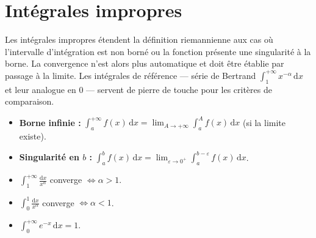 \documentclass[11pt,a4paper,twoside]{book}
\begin{document}
\begin{center}
\end{center}

\section{Intégrales impropres}

Les intégrales impropres étendent la définition riemannienne aux cas où l'intervalle d'intégration est non borné ou la fonction présente une singularité à la borne. La convergence n'est alors plus automatique et doit être établie par passage à la limite. Les intégrales de référence — série de Bertrand $\int_1^{+\infty} x^{-\alpha}\,\mathrm{d}x$ et leur analogue en $0$ — servent de pierre de touche pour les critères de comparaison.

\begin{definitionbox}
\begin{itemize}
  \item \textbf{Borne infinie :} $\displaystyle\int_a^{+\infty} f(x)\,\mathrm{d}x = \lim_{A\to+\infty}\int_a^A f(x)\,\mathrm{d}x$ (si la limite existe).
  \item \textbf{Singularité en $b$ :} $\displaystyle\int_a^b f(x)\,\mathrm{d}x = \lim_{\varepsilon\to0^+}\int_a^{b-\varepsilon} f(x)\,\mathrm{d}x$.
\end{itemize}
\end{definitionbox}

\begin{theoremebox}
\begin{itemize}
  \item $\displaystyle\int_1^{+\infty}\frac{\mathrm{d}x}{x^\alpha}$ converge $\iff \alpha > 1$.
  \item $\displaystyle\int_0^1 \frac{\mathrm{d}x}{x^\alpha}$ converge $\iff \alpha < 1$.
  \item $\displaystyle\int_0^{+\infty} e^{-x}\,\mathrm{d}x = 1$.
\end{itemize}
\end{theoremebox}
\end{document}
